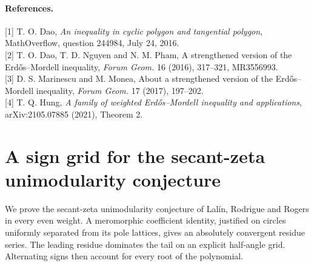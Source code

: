 \documentclass[11pt,a4paper]{article}
\numberwithin{equation}{section}
\theoremstyle{definition}
\theoremstyle{remark}
\newenvironment{sectionabstract}{\par\smallskip\begingroup\small\noindent}{\par\endgroup\medskip}
\begin{document}
\paragraph{References.}
[1] T. O. Dao, \emph{An inequality in cyclic polygon and tangential polygon}, MathOverflow, question 244984, July 24, 2016.\\
{}[2] T. O. Dao, T. D. Nguyen and N. M. Pham, A strengthened version of the Erd\H{o}s--Mordell inequality, \emph{Forum Geom.} 16 (2016), 317--321, MR3556993.\\
{}[3] D. S. Marinescu and M. Monea, About a strengthened version of the Erd\H{o}s--Mordell inequality, \emph{Forum Geom.} 17 (2017), 197--202.\\
{}[4] T. Q. Hung, \emph{A family of weighted Erd\H{o}s--Mordell inequality and applications}, arXiv:2105.07885 (2021), Theorem 2.

\par\endgroup

\begingroup

\section{\texorpdfstring{A sign grid for the secant-zeta unimodularity conjecture}{A sign grid for the secant-zeta unimodularity conjecture}}\label{section:r44reiwa}
\par\medskip


\begin{sectionabstract}
We prove the secant-zeta unimodularity conjecture of Lal\'in, Rodrigue and Rogers in every even weight. A meromorphic coefficient identity, justified on circles uniformly separated from its pole lattices, gives an absolutely convergent residue series. The leading residue dominates the tail on an explicit half-angle grid. Alternating signs then account for every root of the polynomial.
\end{sectionabstract}
\end{document}
